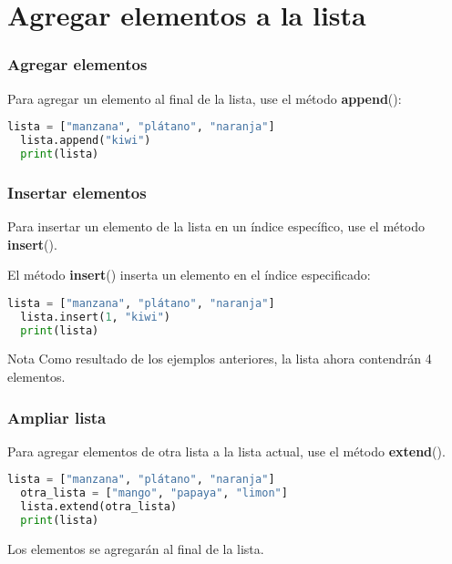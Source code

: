 \section{Agregar elementos a la lista}

\begin{frame}[fragile]
  \frametitle{Agregar elementos}

  Para agregar un elemento al final de la lista, use el método
  \textbf{append}():

  \vspace{\baselineskip}
  \begin{lstlisting}[language=Python]
  lista = ["manzana", "plátano", "naranja"]
  lista.append("kiwi")
  print(lista)
  \end{lstlisting}
\end{frame}

\begin{frame}[fragile]
  \frametitle{Insertar elementos}

  Para insertar un elemento de la lista en un índice específico,
  use el método \textbf{insert}().

  El método \textbf{insert}() inserta un elemento en el
  índice especificado: 

  \vspace{\baselineskip}
  \begin{lstlisting}[language=Python]
  lista = ["manzana", "plátano", "naranja"]
  lista.insert(1, "kiwi")
  print(lista)
  \end{lstlisting}

  \begin{exampleblock}{Nota}
    Como resultado de los ejemplos anteriores,
    la lista ahora contendrán 4 elementos.
  \end{exampleblock}{}
\end{frame}

\begin{frame}[fragile]
  \frametitle{Ampliar lista}

  Para agregar elementos de otra lista a la lista actual,
  use el método \textbf{extend}(). 

  \vspace{\baselineskip}
  \begin{lstlisting}[language=Python]
  lista = ["manzana", "plátano", "naranja"]
  otra_lista = ["mango", "papaya", "limon"]
  lista.extend(otra_lista)
  print(lista)
  \end{lstlisting}

  \vspace{\baselineskip}
  Los elementos se agregarán al final de la lista.
\end{frame}

